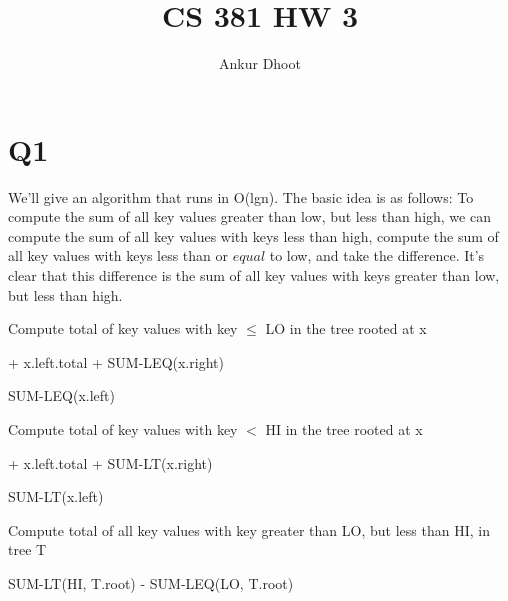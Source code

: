\documentclass[11pt,a4paper]{article}
\begin{document}
\author{Ankur Dhoot}
\title{CS 381 HW 3}
\maketitle

\section*{Q1}
We'll give an algorithm that runs in O(lgn). The basic idea is as follows: \newline
To compute the sum of all key values greater than low, but less than high, we can compute the sum of all key values with keys less than high, compute the sum of all key values with keys less than or $equal$ to low, and take the difference. It's clear that this difference is the sum of all key values with keys greater than low, but less than high. 

\begin{algorithm}
\caption{Compute total of key values with key $\leq$ LO in the tree rooted at x}
\begin{algorithmic}
	\EndIf
		\State {} + x.left.total + SUM-LEQ(x.right)
	
	\Else
		\State \Return SUM-LEQ(x.left)
	\EndIf
	
\EndFunction
\end{algorithmic}
\end{algorithm}

\begin{algorithm}
\caption{Compute total of key values with key $<$ HI in the tree rooted at x}
\begin{algorithmic}
	\EndIf
		\State {} + x.left.total + SUM-LT(x.right)
	
	\Else
		\State \Return SUM-LT(x.left)
	\EndIf
	
\EndFunction
\end{algorithmic}
\end{algorithm}


\begin{algorithm}
\caption{Compute total of all key values with key greater than LO, but less than HI, in tree T}
\begin{algorithmic}
	\State \Return SUM-LT(HI, T.root) - SUM-LEQ(LO, T.root)
\EndFunction
\end{algorithmic}
\end{algorithm}
\end{document}
